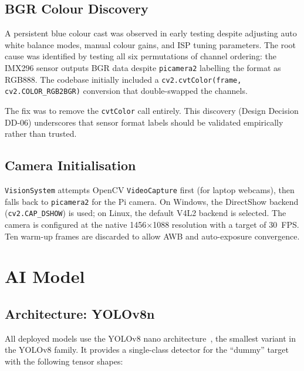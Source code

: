 \subsection{BGR Colour Discovery}

A persistent blue colour cast was observed in early testing despite adjusting
auto white balance modes, manual colour gains, and ISP tuning parameters.
The root cause was identified by testing all six permutations of channel ordering:
the IMX296 sensor outputs BGR data despite \texttt{picamera2} labelling the
format as RGB888. The codebase initially included a
\texttt{cv2.cvtColor(frame, cv2.COLOR\_RGB2BGR)} conversion that double-swapped
the channels.

The fix was to remove the \texttt{cvtColor} call entirely. This discovery
(Design Decision DD-06) underscores that sensor format labels should be
validated empirically rather than trusted.

\subsection{Camera Initialisation}

\texttt{VisionSystem} attempts OpenCV \texttt{VideoCapture} first (for laptop
webcams), then falls back to \texttt{picamera2} for the Pi camera. On Windows,
the DirectShow backend (\texttt{cv2.CAP\_DSHOW}) is used; on Linux, the default
V4L2 backend is selected. The camera is configured at the native 1456$\times$1088
resolution with a target of 30~FPS. Ten warm-up frames are discarded to allow AWB
and auto-exposure convergence.


\section{AI Model}
\label{sec:ai-model}

\subsection{Architecture: YOLOv8n}

All deployed models use the YOLOv8 nano architecture~\cite{yolov8},
the smallest variant in the YOLOv8 family. It provides a single-class detector
for the ``dummy'' target with the following tensor shapes:

